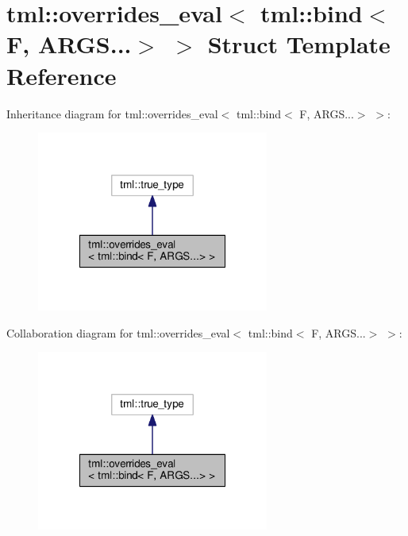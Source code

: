 \hypertarget{structtml_1_1overrides__eval_3_01tml_1_1bind_3_01_f_00_01_a_r_g_s_8_8_8_4_01_4}{\section{tml\+:\+:overrides\+\_\+eval$<$ tml\+:\+:bind$<$ F, A\+R\+G\+S...$>$ $>$ Struct Template Reference}
\label{structtml_1_1overrides__eval_3_01tml_1_1bind_3_01_f_00_01_a_r_g_s_8_8_8_4_01_4}
}


Inheritance diagram for tml\+:\+:overrides\+\_\+eval$<$ tml\+:\+:bind$<$ F, A\+R\+G\+S...$>$ $>$\+:
\nopagebreak
\begin{figure}[H]
\begin{center}
\leavevmode
\includegraphics[width=216pt]{structtml_1_1overrides__eval_3_01tml_1_1bind_3_01_f_00_01_a_r_g_s_8_8_8_4_01_4__inherit__graph}
\end{center}
\end{figure}


Collaboration diagram for tml\+:\+:overrides\+\_\+eval$<$ tml\+:\+:bind$<$ F, A\+R\+G\+S...$>$ $>$\+:
\nopagebreak
\begin{figure}[H]
\begin{center}
\leavevmode
\includegraphics[width=216pt]{structtml_1_1overrides__eval_3_01tml_1_1bind_3_01_f_00_01_a_r_g_s_8_8_8_4_01_4__coll__graph}
\end{center}
\end{figure}


